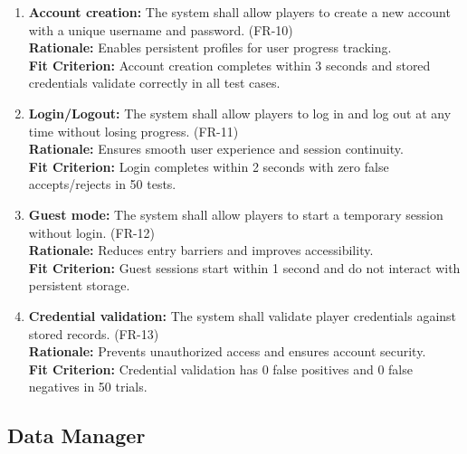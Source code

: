 \documentclass[12pt]{article}
\begin{document}
\begin{enumerate}
    \item \textbf{Account creation:} The system shall allow players to create a new account with a unique username and password. (FR-10) \\
    \textbf{Rationale:} Enables persistent profiles for user progress tracking. \\
    \textbf{Fit Criterion:} Account creation completes within 3 seconds and stored credentials validate correctly in all test cases.

    \item \textbf{Login/Logout:} The system shall allow players to log in and log out at any time without losing progress. (FR-11) \\
    \textbf{Rationale:} Ensures smooth user experience and session continuity. \\
    \textbf{Fit Criterion:} Login completes within 2 seconds with zero false accepts/rejects in 50 tests.

    \item \textbf{Guest mode:} The system shall allow players to start a temporary session without login. (FR-12) \\
    \textbf{Rationale:} Reduces entry barriers and improves accessibility. \\
    \textbf{Fit Criterion:} Guest sessions start within 1 second and do not interact with persistent storage.

    \item \textbf{Credential validation:} The system shall validate player credentials against stored records. (FR-13) \\
    \textbf{Rationale:} Prevents unauthorized access and ensures account security. \\
    \textbf{Fit Criterion:} Credential validation has 0 false positives and 0 false negatives in 50 trials.
\end{enumerate}

\subsection{Data Manager}
\end{document}

